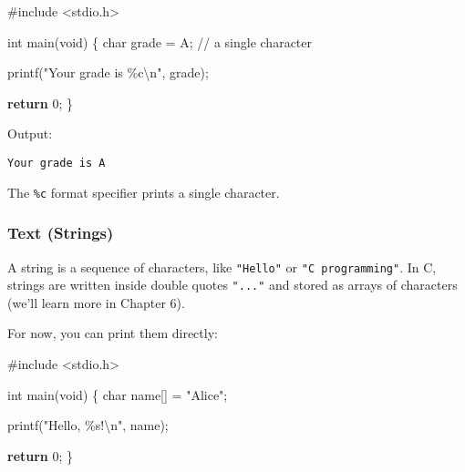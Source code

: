 \documentclass[
  letterpaper,
  DIV=11,
  numbers=noendperiod]{scrreprt}
\newenvironment{Shaded}{\begin{snugshade}}{\end{snugshade}}
\newcommand{\CharTok}[1]{\textcolor[rgb]{0.13,0.47,0.30}{#1}}
\newcommand{\CommentTok}[1]{\textcolor[rgb]{0.37,0.37,0.37}{#1}}
\newcommand{\ControlFlowTok}[1]{\textcolor[rgb]{0.00,0.23,0.31}{\textbf{#1}}}
\newcommand{\DataTypeTok}[1]{\textcolor[rgb]{0.68,0.00,0.00}{#1}}
\newcommand{\DecValTok}[1]{\textcolor[rgb]{0.68,0.00,0.00}{#1}}
\newcommand{\ImportTok}[1]{\textcolor[rgb]{0.00,0.46,0.62}{#1}}
\newcommand{\NormalTok}[1]{\textcolor[rgb]{0.00,0.23,0.31}{#1}}
\newcommand{\OperatorTok}[1]{\textcolor[rgb]{0.37,0.37,0.37}{#1}}
\newcommand{\PreprocessorTok}[1]{\textcolor[rgb]{0.68,0.00,0.00}{#1}}
\newcommand{\SpecialCharTok}[1]{\textcolor[rgb]{0.37,0.37,0.37}{#1}}
\newcommand{\StringTok}[1]{\textcolor[rgb]{0.13,0.47,0.30}{#1}}
\begin{document}
\begin{Shaded}
\begin{Highlighting}[]
\PreprocessorTok{\#include }\ImportTok{\textless{}stdio.h\textgreater{}}

\DataTypeTok{int}\NormalTok{ main}\OperatorTok{(}\DataTypeTok{void}\OperatorTok{)} \OperatorTok{\{}
    \DataTypeTok{char}\NormalTok{ grade }\OperatorTok{=} \CharTok{\textquotesingle{}A\textquotesingle{}}\OperatorTok{;}   \CommentTok{// a single character}

\NormalTok{    printf}\OperatorTok{(}\StringTok{"Your grade is }\SpecialCharTok{\%c\textbackslash{}n}\StringTok{"}\OperatorTok{,}\NormalTok{ grade}\OperatorTok{);}

    \ControlFlowTok{return} \DecValTok{0}\OperatorTok{;}
\OperatorTok{\}}
\end{Highlighting}
\end{Shaded}

Output:

\begin{verbatim}
Your grade is A
\end{verbatim}

The \texttt{\%c} format specifier prints a single character.

\subsubsection{Text (Strings)}\label{text-strings}

A string is a sequence of characters, like \texttt{"Hello"} or
\texttt{"C\ programming"}. In C, strings are written inside double
quotes \texttt{"..."} and stored as arrays of characters (we'll learn
more in Chapter 6).

For now, you can print them directly:

\begin{Shaded}
\begin{Highlighting}[]
\PreprocessorTok{\#include }\ImportTok{\textless{}stdio.h\textgreater{}}

\DataTypeTok{int}\NormalTok{ main}\OperatorTok{(}\DataTypeTok{void}\OperatorTok{)} \OperatorTok{\{}
    \DataTypeTok{char}\NormalTok{ name}\OperatorTok{[]} \OperatorTok{=} \StringTok{"Alice"}\OperatorTok{;}

\NormalTok{    printf}\OperatorTok{(}\StringTok{"Hello, }\SpecialCharTok{\%s}\StringTok{!}\SpecialCharTok{\textbackslash{}n}\StringTok{"}\OperatorTok{,}\NormalTok{ name}\OperatorTok{);}

    \ControlFlowTok{return} \DecValTok{0}\OperatorTok{;}
\OperatorTok{\}}
\end{Highlighting}
\end{Shaded}
\end{document}

